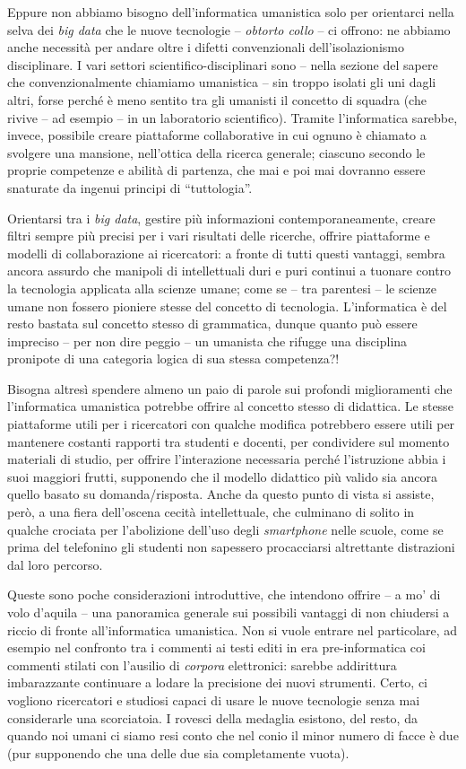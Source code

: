 \documentclass[
  b5paper,
  twoside,
  12pt,
  chapterprefix=false,
  bibliography=totocnumbered,
  parskip=false]{scrbook}
\begin{document}
Eppure non abbiamo bisogno dell'informatica umanistica solo per
orientarci nella selva dei \emph{big data} che le nuove tecnologie --
\emph{obtorto collo} -- ci offrono: ne abbiamo anche necessità per andare
oltre i difetti convenzionali dell'isolazionismo disciplinare. I vari
settori scientifico-disciplinari sono -- nella sezione del sapere che
convenzionalmente chiamiamo umanistica -- sin troppo isolati gli uni
dagli altri, forse perché è meno sentito tra gli umanisti il concetto di
squadra (che rivive -- ad esempio -- in un laboratorio scientifico).
Tramite l'informatica sarebbe, invece, possibile creare piattaforme
collaborative in cui ognuno è chiamato a svolgere una mansione,
nell'ottica della ricerca generale; ciascuno secondo le proprie
competenze e abilità di partenza, che mai e poi mai dovranno essere
snaturate da ingenui principi di \enquote{tuttologia}.

Orientarsi tra i \emph{big data}, gestire più informazioni
contemporaneamente, creare filtri sempre più precisi per i vari
risultati delle ricerche, offrire piattaforme e modelli di
collaborazione ai ricercatori: a fronte di tutti questi vantaggi, sembra
ancora assurdo che manipoli di intellettuali duri e puri continui a
tuonare contro la tecnologia applicata alla scienze umane; come se --
tra parentesi -- le scienze umane non fossero pioniere stesse del
concetto di tecnologia. L'informatica è del resto bastata sul concetto
stesso di grammatica, dunque quanto può essere impreciso -- per non dire
peggio -- un umanista che rifugge una disciplina pronipote di una
categoria logica di sua stessa competenza?!

Bisogna altresì spendere almeno un paio di parole sui profondi
miglioramenti che l'informatica umanistica potrebbe offrire al concetto
stesso di didattica. Le stesse piattaforme utili per i ricercatori con
qualche modifica potrebbero essere utili per mantenere costanti rapporti
tra studenti e docenti, per condividere sul momento materiali di studio,
per offrire l'interazione necessaria perché l'istruzione abbia i suoi
maggiori frutti, supponendo che il modello didattico più valido sia
ancora quello basato su domanda/risposta. Anche da questo punto di vista
si assiste, però, a una fiera dell'oscena cecità intellettuale, che
culminano di solito in qualche crociata per l'abolizione dell'uso degli
\emph{smartphone} nelle scuole, come se prima del telefonino gli studenti non
sapessero procacciarsi altrettante distrazioni dal loro percorso.

Queste sono poche considerazioni introduttive, che intendono offrire --
a mo' di volo d'aquila -- una panoramica generale sui possibili vantaggi
di non chiudersi a riccio di fronte all'informatica umanistica. Non si
vuole entrare nel particolare, ad esempio nel confronto tra i commenti
ai testi editi in era pre-informatica coi commenti stilati con l'ausilio
di \emph{corpora} elettronici: sarebbe addirittura imbarazzante continuare a
lodare la precisione dei nuovi strumenti. Certo, ci vogliono ricercatori
e studiosi capaci di usare le nuove tecnologie senza mai considerarle
una scorciatoia. I rovesci della medaglia esistono, del resto, da quando
noi umani ci siamo resi conto che nel conio il minor numero di facce è
due (pur supponendo che una delle due sia completamente vuota).
\end{document}
